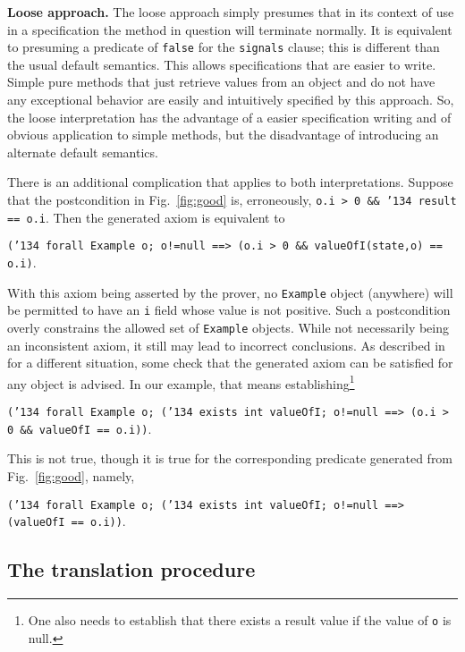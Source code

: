 \documentclass{sig-alternate}
\begin{document}
{\bf Loose approach.}  The loose approach simply presumes that in its context of use in a
specification the method in question will terminate normally.   It is equivalent to presuming a predicate of \texttt{false} for the \texttt{signals}
clause; this is different than the usual default semantics.  This allows specifications that
are easier to write. 
Simple pure methods that just retrieve values from an object and
do not have any exceptional behavior are easily and intuitively specified by this approach.
So, the loose interpretation has the advantage of a easier specification writing and of obvious
application to simple methods, but the disadvantage of introducing an alternate default semantics. 

There is an additional complication that applies to both interpretations.  Suppose that the 
postcondition in Fig.~\ref{fig:good} is, erroneously,  \texttt{o.i > 0 \&\& \char'134 result == o.i}.  Then the generated axiom is equivalent to
\begin{center}\texttt{(\char'134 forall Example o;  o!=null ==> (o.i > 0 \&\& valueOfI(state,o) == o.i)}.\end{center}
With this axiom being asserted by the prover, no \texttt{Example} object (anywhere) will be permitted to have an \texttt{i} field whose value is not positive.  Such a postcondition overly
constrains the allowed set of \texttt{Example} objects.  While not necessarily being an
inconsistent axiom, it still may lead to incorrect conclusions.   As described 
in \cite{BreunessePoll03} for a different situation, some check that the generated axiom can
be satisfied for any object is advised.  In our example, that means establishing\footnote{One also needs to establish that there exists a
result value if the value of \texttt{o} is null.}
\begin{center}\texttt{(\char'134 forall Example o;  (\char'134 exists int valueOfI; o!=null ==> (o.i > 0 \&\& valueOfI == o.i))}.\end{center}
This is not true, though it is true for the corresponding predicate generated from Fig.~\ref{fig:good}, 
namely,
\begin{center}\texttt{(\char'134 forall Example o;  (\char'134 exists int valueOfI; o!=null ==> (valueOfI == o.i))}.\end{center}


\subsection{The translation procedure}
\end{document}
